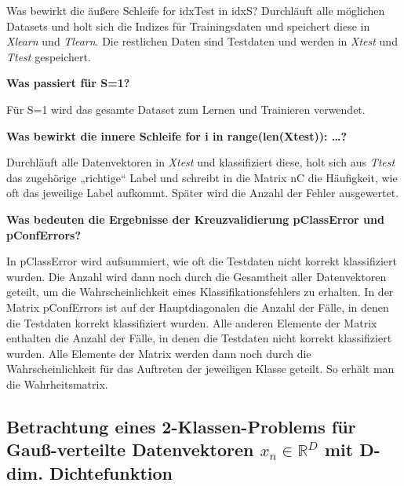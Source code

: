 \vspace{5px}
\noindent
Was bewirkt die äußere Schleife for idxTest in idxS?
Durchläuft alle möglichen Datasets und holt sich die Indizes für Trainingsdaten und speichert diese in \textit{X\textunderscore learn} und \textit{T\textunderscore learn}. Die restlichen Daten sind Testdaten und werden in \textit{X\textunderscore test} und \textit{T\textunderscore test} gespeichert. 

\vspace{5px}
\noindent
\textbf{Was passiert für S=1?}

\vspace{5px}
\noindent
Für S=1 wird das gesamte Dataset zum Lernen und Trainieren verwendet.

\vspace{5px}
\noindent
\textbf{Was bewirkt die innere Schleife for i in range(len(X\textunderscore test)): …?}

\vspace{5px}
\noindent
Durchläuft alle Datenvektoren in \textit{X\textunderscore test} und klassifiziert diese, holt sich aus \textit{T\textunderscore test} das zugehörige „richtige“ Label und schreibt in die Matrix nC die Häufigkeit, wie oft das jeweilige Label aufkommt. Später wird die Anzahl der Fehler ausgewertet. 

\vspace{5px}
\noindent
\textbf{Was bedeuten die Ergebnisse der Kreuzvalidierung pClassError und pConfErrors?}

\vspace{5px}
\noindent
In pClassError wird aufsummiert, wie oft die Testdaten nicht korrekt klassifiziert wurden. Die Anzahl wird dann noch durch die Gesamtheit aller Datenvektoren geteilt, um die Wahrscheinlichkeit eines Klassifikationsfehlers zu erhalten.
In der Matrix pConfErrors ist auf der Hauptdiagonalen die Anzahl der Fälle, in denen die Testdaten korrekt klassifiziert wurden. Alle anderen Elemente der Matrix enthalten die Anzahl der Fälle, in denen die Testdaten nicht korrekt klassifiziert wurden. Alle Elemente der Matrix werden dann noch durch die Wahrscheinlichkeit für das Auftreten der jeweiligen Klasse geteilt. So erhält man die Wahrheitsmatrix. 

\subsection{Betrachtung eines 2-Klassen-Problems für Gauß-verteilte Datenvektoren $x_n \in \mathbb{R}^D$ mit D-dim. Dichtefunktion}

